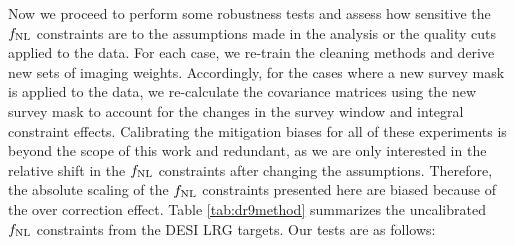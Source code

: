 Now we proceed to perform some robustness tests and assess how sensitive the $f_{\rm NL}$ constraints are to the assumptions made in the analysis or the quality cuts applied to the data. For each case, we re-train the cleaning methods and derive new sets of imaging weights. Accordingly, for the cases where a new survey mask is applied to the data, we re-calculate the covariance matrices using the new survey mask to account for the changes in the survey window and integral constraint effects. Calibrating the mitigation biases for all of these experiments is beyond the scope of this work and redundant, as we are only interested in the relative shift in the $f_{\rm NL}$ constraints after changing the assumptions. Therefore, the absolute scaling of the $f_{\rm NL}$ constraints presented here are biased because of the over correction effect. Table \ref{tab:dr9method} summarizes the uncalibrated $f_{\rm NL}$ constraints from the DESI LRG targets. Our tests are as follows:

